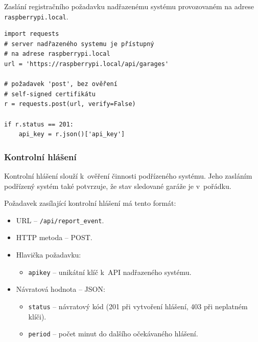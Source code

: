 \begin{listing}[htbp]
\caption{\label{lst:api_reg} Zaslání registračního požadavku nadřazenému systému provozovaném na adrese \texttt{raspberrypi.local}.}
\begin{verbatim}
import requests
# server nadřazeného systemu je přístupný
# na adrese raspberrypi.local
url = 'https://raspberrypi.local/api/garages'

# požadavek 'post', bez ověření
# self-signed certifikátu
r = requests.post(url, verify=False)

if r.status == 201:
    api_key = r.json()['api_key']
\end{verbatim}
\end{listing}

\subsubsection{Kontrolní hlášení}

Kontrolní hlášení slouží k~ověření činnosti podřízeného systému. Jeho zasláním podřízený systém také potvrzuje, že stav sledované garáže je v~pořádku. 

Požadavek zasílající kontrolní hlášení má tento formát:

\begin{itemize}
    \item URL -- \texttt{/api/report\_event}.
    \item HTTP metoda -- POST.
    \item Hlavička požadavku:
    \begin{itemize}
        \item \texttt{apikey} -- unikátní klíč k~API nadřazeného systému.
    \end{itemize}
    \item Návratová hodnota -- JSON:
    \begin{itemize}
        \item \texttt{status} -- návratový kód (201 při vytvoření hlášení, 403 při neplatném klíči).
        \item \texttt{period} -- počet minut do dalšího očekávaného hlášení.
    \end{itemize}
\end{itemize}

